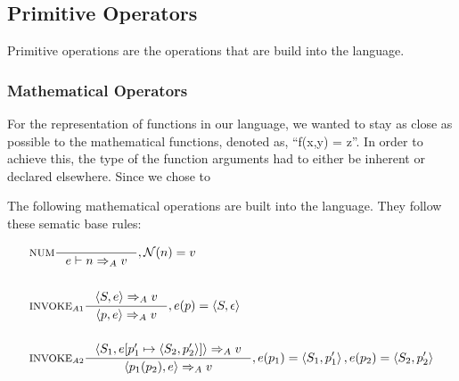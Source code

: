 \subsection{Primitive Operators}
\label{subsec:primitiveOps}
\newcommand{\Tand}{\text{\; AND \;}}
\newcommand{\Tnot}{\text{NOT \;}}
\newcommand{\Tnand}{\text{\; NAND \;}}
\newcommand{\Tor}{\text{\; OR \;}} 
\newcommand{\Tnor}{\text{\; NOR \;}}
\newcommand{\Txor}{\text{\; XOR \;}}

Primitive operations are the operations that are build into the language.

\subsubsection{Mathematical Operators}
\label{sec:mathOps}

For the representation of functions in our language, we wanted to stay as close as possible to the mathematical functions, denoted as, \enquote{f(x,y) = z}. In order to achieve this, the type of the function arguments had to either be inherent or declared elsewhere. Since we chose to 


The following mathematical operations are built into the language. They follow these sematic base rules:

\begin{align*}
&\inference[NUM]{}
                  {e \vdash n \Rightarrow_A v}
                  {, \mathcal{N}(n) = v}
\\\\
&\inference[$\text{INVOKE}_{A1}$]{\Braket{S,e} \Rightarrow_A v}
                  {\Braket{p,e} \Rightarrow_A v}
                  {,e(p) = \Braket{S,\epsilon}}
\\\\
&\inference[$\text{INVOKE}_{A2}$]{\Braket{S_1,e[p_1' \mapsto \Braket{S_2,p_2'}]} \Rightarrow_A v}
                  {\Braket{p_1(p_2),e} \Rightarrow_A v}
                  {,e(p_1) = \Braket{S_1,p_1'}, e(p_2) = \Braket{S_2,p_2'}}
\\\\
\end{align*}

